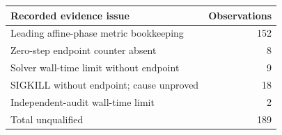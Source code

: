 \begin{tabular}{lr}
\toprule
Recorded evidence issue & Observations\\
\midrule
Leading affine-phase metric bookkeeping & 152\\
Zero-step endpoint counter absent & 8\\
Solver wall-time limit without endpoint & 9\\
SIGKILL without endpoint; cause unproved & 18\\
Independent-audit wall-time limit & 2\\
\midrule
Total unqualified & 189\\
\bottomrule
\end{tabular}
